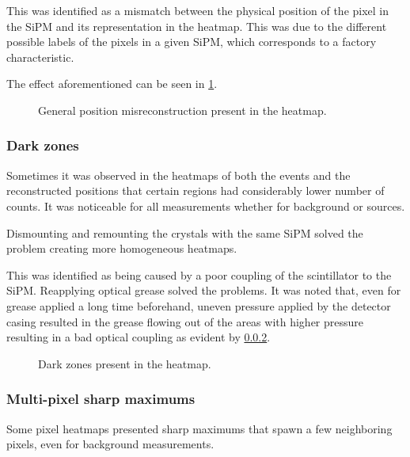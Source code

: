 This was identified as a mismatch between the physical position of the pixel in the \ac{SiPM} and its representation in the heatmap.
This was due to the different possible labels of the pixels in a given \ac{SiPM}, which corresponds to a factory characteristic.

The effect aforementioned can be seen in \ref{fig:PositionMisreconstructionHeatmap}.

\begin{figure}[h!]
    \centering
    \caption{General position misreconstruction present in the heatmap.}%
    \label{fig:PositionMisreconstructionHeatmap}
\end{figure}

\subsubsection{Dark zones}

Sometimes it was observed in the heatmaps of both the events and the reconstructed positions that certain regions had considerably lower number of counts. It was  noticeable for all measurements whether for background or sources.

Dismounting and remounting the crystals with the same \ac{SiPM} solved the problem creating more homogeneous heatmaps.

This was identified as being caused by a poor coupling of the scintillator to the \ac{SiPM}. Reapplying optical grease solved the problems. It was noted that, even for grease applied a long time beforehand, uneven pressure applied by the detector casing resulted in the grease flowing out of the areas with higher pressure resulting in a bad optical coupling as evident by \ref{}.

\begin{figure}[h!]
    \centering
    \qquad
    \caption{Dark zones present in the heatmap.}%
    \label{fig:DarkZonesHeatmap}
\end{figure}

\subsubsection{Multi-pixel sharp maximums}

Some pixel heatmaps presented sharp maximums that spawn a few neighboring pixels, even for background measurements.

